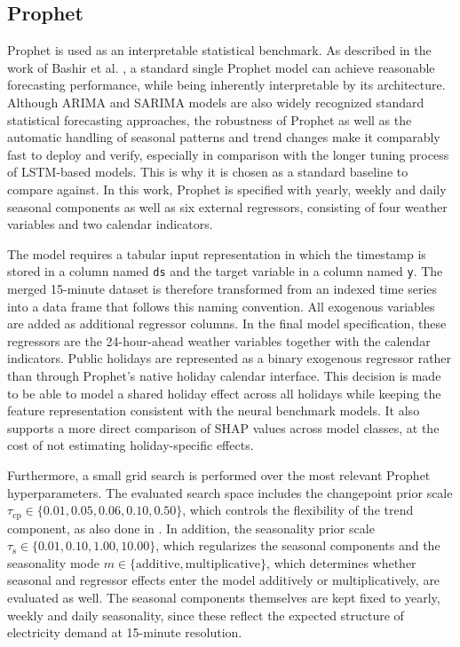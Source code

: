 \documentclass[Master,english,IEEE]{twbook}
\begin{document}
\subsection{Prophet}
Prophet is used as an interpretable statistical benchmark. As described in the work of Bashir et al. \cite{bashirShortTermElectricity2022}, a standard single Prophet model can achieve reasonable forecasting performance, while being inherently interpretable by its architecture. Although ARIMA and SARIMA models are also widely recognized standard statistical forecasting approaches, the robustness of Prophet as well as the automatic handling of seasonal patterns and trend changes make it comparably fast to deploy and verify, especially in comparison with the longer tuning process of LSTM-based models. This is why it is chosen as a standard baseline to compare against. In this work, Prophet is specified with yearly, weekly and daily seasonal components as well as six external regressors, consisting of four weather variables and two calendar indicators.

The model requires a tabular input representation in which the timestamp is stored in a column named \texttt{ds} and the target variable in a column named \texttt{y}. The merged 15-minute dataset is therefore transformed from an indexed time series into a data frame that follows this naming convention. All exogenous variables are added as additional regressor columns. In the final model specification, these regressors are the 24-hour-ahead weather variables together with the calendar indicators. Public holidays are represented as a binary exogenous regressor rather than through Prophet's native holiday calendar interface. This decision is made to be able to model a shared holiday effect across all holidays while keeping the feature representation consistent with the neural benchmark models. It also supports a more direct comparison of SHAP values across model classes, at the cost of not estimating holiday-specific effects.

Furthermore, a small grid search is performed over the most relevant Prophet hyperparameters. The evaluated search space includes the changepoint prior scale 
\(\tau_{\mathrm{cp}} \in \{0.01, 0.05, 0.06, 0.10, 0.50\}\), 
which controls the flexibility of the trend component, as also done in \cite{bashirShortTermElectricity2022}. In addition, the seasonality prior scale 
\(\tau_{\mathrm{s}} \in \{0.01, 0.10, 1.00, 10.00\}\), 
which regularizes the seasonal components and the seasonality mode 
\(m \in \{\text{additive}, \text{multiplicative}\}\), 
which determines whether seasonal and regressor effects enter the model additively or multiplicatively, are evaluated as well. The seasonal components themselves are kept fixed to yearly, weekly and daily seasonality, since these reflect the expected structure of electricity demand at 15-minute resolution.
\end{document}
